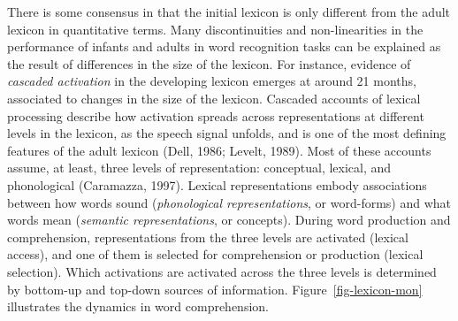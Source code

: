 \documentclass[
  12pt,
  b5paperpaper,
  twoside]{scrreprt}
\begin{document}
There is some consensus in that the initial lexicon is only different
from the adult lexicon in quantitative terms. Many discontinuities and
non-linearities in the performance of infants and adults in word
recognition tasks can be explained as the result of differences in the
size of the lexicon. For instance, evidence of \emph{cascaded
activation} in the developing lexicon emerges at around 21 months,
associated to changes in the size of the lexicon. Cascaded accounts of
lexical processing describe how activation spreads across
representations at different levels in the lexicon, as the speech signal
unfolds, and is one of the most defining features of the adult lexicon
(Dell, 1986; Levelt, 1989). Most of these accounts assume, at least,
three levels of representation: conceptual, lexical, and phonological
(Caramazza, 1997). Lexical representations embody associations between
how words sound (\emph{phonological representations}, or word-forms) and
what words mean (\emph{semantic representations}, or concepts). During
word production and comprehension, representations from the three levels
are activated (lexical access), and one of them is selected for
comprehension or production (lexical selection). Which activations are
activated across the three levels is determined by bottom-up and
top-down sources of information. Figure~\ref{fig-lexicon-mon}
illustrates the dynamics in word comprehension.
\end{document}
